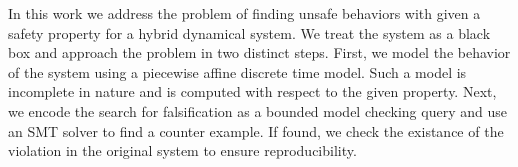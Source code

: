 In this work we address the problem of finding unsafe behaviors with
given a safety property for a hybrid dynamical system. We treat the
system as a black box and approach the problem in two distinct steps.
First, we model the behavior of the system using a piecewise affine
discrete time model. Such a model is incomplete in nature and is
computed with respect to the given property. Next, we encode the
search for falsification as a bounded model checking query and use an
SMT solver to find a counter example. If found, we check the existance
of the violation in the original system to ensure reproducibility.

